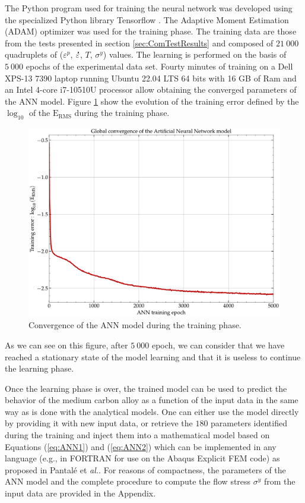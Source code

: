 \documentclass[twoside,english,1p,final,sort&compress]{elsarticle}
\makeatletter
\theoremstyle{plain}
\DeclareRobustCommand{\mdot}[1]{\accentset{\mbox{\bfseries .}}{#1}}
\DeclareRobustCommand{\eal}{et \emph{al.}\@\xspace}
\DeclareRobustCommand{\eg}{e.g.,\@\xspace}
\DeclareRobustCommand{\RMSE}{\text{E}_\text{RMS}}
\makeatother
\begin{document}
The Python program used for training the neural network was developed using the specialized Python library Tensorflow \cite{Abadi-2016}.
The Adaptive Moment Estimation (ADAM) optimizer \cite{Kingma-2015} was used for the training phase.
The training data are those from the tests presented in section \ref{sec:ComTestResults} and composed of $21~000$ quadruplets of ($\varepsilon^p$, $\mdot\varepsilon$, $T$, $\sigma^y$) values.
The learning is performed on the basis of $5~000$ epochs of the experimental data set.
Fourty minutes of training on a Dell XPS-13 7390 laptop running Ubuntu 22.04 LTS 64 bits with 16 GB of Ram and an Intel 4-core i7-10510U processor allow obtaining the converged parameters of the ANN model.
Figure \ref{fig:ANN-6-conv} show the evolution of the training error defined by the $\log_{10}$ of the $\RMSE$  during the training phase.
\begin{figure}[!ht]
\centering
\includegraphics[width=0.7\columnwidth]
{Figures/Conv-ANN-6}
\caption{Convergence of the ANN model during the training phase.}
\label{fig:ANN-6-conv}
\end{figure}
As we can see on this figure, after $5~000$ epoch, we can consider that we have reached a stationary state of the model learning and that it is useless to continue the learning phase.

Once the learning phase is over, the trained model can be used to predict the behavior of the medium carbon alloy as a function of the input data in the same way as is done with the analytical models.
One can either use the model directly by providing it with new input data, or retrieve the $180$ parameters identified during the training and inject them into a mathematical model based on Equations (\ref{eq:ANN1}) and (\ref{eq:ANN2}) which can be implemented in any language (\eg in FORTRAN for use on the Abaqus Explicit FEM code) as proposed in Pantalé \eal \cite{Pantale-2021}.
For reasons of compactness, the parameters of the ANN model and the complete procedure to compute the flow stress $\sigma^y$ from the input data are provided in the Appendix.
\end{document}
